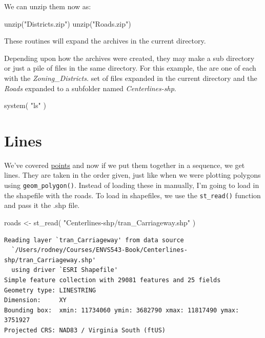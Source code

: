 \documentclass[
  letterpaper,
]{book}
\newenvironment{Shaded}{\begin{snugshade}}{\end{snugshade}}
\newcommand{\FunctionTok}[1]{\textcolor[rgb]{0.28,0.35,0.67}{#1}}
\newcommand{\NormalTok}[1]{\textcolor[rgb]{0.00,0.23,0.31}{#1}}
\newcommand{\OtherTok}[1]{\textcolor[rgb]{0.00,0.23,0.31}{#1}}
\newcommand{\StringTok}[1]{\textcolor[rgb]{0.13,0.47,0.30}{#1}}
\begin{document}
We can unzip them now as:

\begin{Shaded}
\begin{Highlighting}[]
\FunctionTok{unzip}\NormalTok{(}\StringTok{"Districts.zip"}\NormalTok{)}
\FunctionTok{unzip}\NormalTok{(}\StringTok{"Roads.zip"}\NormalTok{)}
\end{Highlighting}
\end{Shaded}

These routines will expand the archives in the current directory.

Depending upon how the archives were created, they may make a sub
directory or just a pile of files in the same directory. For this
example, the are one of each with the \emph{Zoning\_Districts.} set of
files expanded in the current directory and the \emph{Roads} expanded to
a subfolder named \emph{Centerlines-shp}.

\begin{Shaded}
\begin{Highlighting}[]
\FunctionTok{system}\NormalTok{( }\StringTok{"ls"}\NormalTok{ )}
\end{Highlighting}
\end{Shaded}

\section{Lines}\label{lines}

We've covered
\href{https://dyerlabteaching.github.io/Spatial-Points/slides.html\#/title-slide}{points}
and now if we put them together in a sequence, we get lines. They are
taken in the order given, just like when we were plotting polygons using
\texttt{geom\_polygon()}. Instead of loading these in manually, I'm
going to load in the shapefile with the roads. To load in shapefiles, we
use the \texttt{st\_read()} function and pass it the .shp file.

\begin{Shaded}
\begin{Highlighting}[]
\NormalTok{roads }\OtherTok{\textless{}{-}} \FunctionTok{st\_read}\NormalTok{( }\StringTok{"Centerlines{-}shp/tran\_Carriageway.shp"}\NormalTok{ ) }
\end{Highlighting}
\end{Shaded}

\begin{verbatim}
Reading layer `tran_Carriageway' from data source 
  `/Users/rodney/Courses/ENVS543-Book/Centerlines-shp/tran_Carriageway.shp' 
  using driver `ESRI Shapefile'
Simple feature collection with 29081 features and 25 fields
Geometry type: LINESTRING
Dimension:     XY
Bounding box:  xmin: 11734060 ymin: 3682790 xmax: 11817490 ymax: 3751927
Projected CRS: NAD83 / Virginia South (ftUS)
\end{verbatim}
\end{document}
